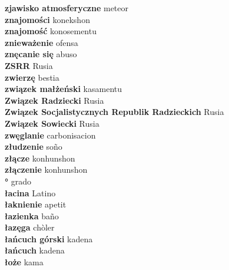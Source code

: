 \textbf{ zjawisko atmosferyczne  } meteor \\
\textbf{ znajomości  } konekshon \\
\textbf{ znajomość  } konosementu \\
\textbf{ znieważenie  } ofensa \\
\textbf{ znęcanie się  } abuso \\
\textbf{ ZSRR  } Rusia \\
\textbf{ zwierzę  } bestia \\
\textbf{ związek małżeński  } kasamentu \\
\textbf{ Związek Radziecki  } Rusia \\
\textbf{ Związek Socjalistycznych Republik Radzieckich  } Rusia \\
\textbf{ Związek Sowiecki  } Rusia \\
\textbf{ zwęglanie  } carbonisacion \\
\textbf{ złudzenie  } soño \\
\textbf{ złącze  } konhunshon \\
\textbf{ złączenie  } konhunshon \\
\textbf{ °  } grado \\
\textbf{ łacina  } Latino \\
\textbf{ łaknienie  } apetit \\
\textbf{ łazienka  } baño \\
\textbf{ łazęga  } chòler \\
\textbf{ łańcuch górski  } kadena \\
\textbf{ łańcuch  } kadena \\
\textbf{ łoże  } kama \\
